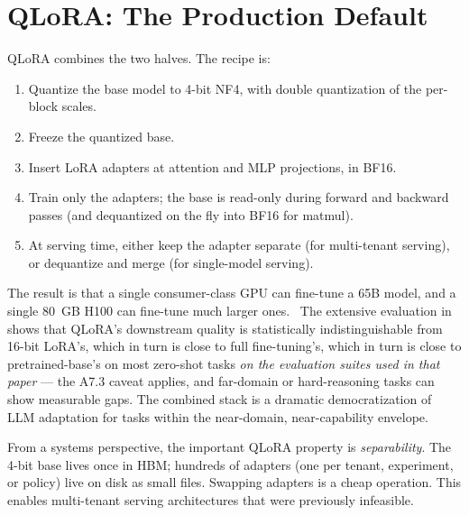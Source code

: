 \section{QLoRA: The Production Default}

QLoRA \citep{dettmers2023qlora} combines the two halves. The recipe
is:

\begin{enumerate}
  \item Quantize the base model to 4-bit NF4, with double quantization
        of the per-block scales.
  \item Freeze the quantized base.
  \item Insert LoRA adapters at attention and MLP projections, in
        BF16.
  \item Train only the adapters; the base is read-only during
        forward and backward passes (and dequantized on the fly
        into BF16 for matmul).
  \item At serving time, either keep the adapter separate (for
        multi-tenant serving), or dequantize and merge (for
        single-model serving).
\end{enumerate}

The result is that a single consumer-class GPU can fine-tune a 65B
model, and a single 80~GB H100 can fine-tune much larger ones. \Emp\
The extensive evaluation in \citet{dettmers2023qlora} shows that
QLoRA's downstream quality is statistically indistinguishable from
16-bit LoRA's, which in turn is close to full fine-tuning's, which
in turn is close to pretrained-base's on most zero-shot tasks
\emph{on the evaluation suites used in that paper} --- the A7.3
caveat applies, and far-domain or hard-reasoning tasks can show
measurable gaps. The combined stack is a dramatic democratization of
LLM adaptation for tasks within the near-domain, near-capability
envelope.

From a systems perspective, the important QLoRA property is
\emph{separability}. The 4-bit base lives once in HBM; hundreds of
adapters (one per tenant, experiment, or policy) live on disk as
small files. Swapping adapters is a cheap operation. This enables
multi-tenant serving architectures that were previously infeasible.

